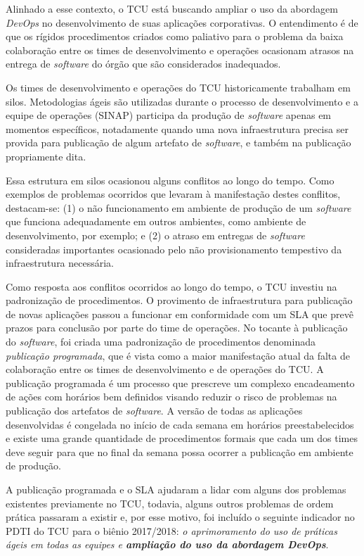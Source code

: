 Alinhado a esse contexto, o \acrfull{TCU} está buscando ampliar o uso da abordagem
\textit{DevOps} no desenvolvimento de suas aplicações corporativas. O
entendimento é de que os rígidos procedimentos criados como paliativo para o
problema da baixa colaboração entre os times de desenvolvimento e operações
ocasionam atrasos na entrega de \textit{software} do órgão que são considerados
inadequados.

Os times de desenvolvimento e operações do \acrshort{TCU} historicamente
trabalham em silos. Metodologias ágeis são utilizadas durante o processo de
desenvolvimento e a equipe de operações (\acrfull{SINAP}) participa da produção
de \textit{software} apenas em momentos específicos, notadamente quando uma nova
infraestrutura precisa ser provida para publicação de algum artefato de
\textit{software}, e também na publicação propriamente dita.

Essa estrutura em silos ocasionou alguns conflitos ao longo do tempo. Como
exemplos de problemas ocorridos que levaram à manifestação
destes conflitos, destacam-se: (1) o não funcionamento em ambiente de produção
de um \textit{software} que funciona adequadamente
em outros ambientes, como ambiente de desenvolvimento, por exemplo; e (2) o
atraso em entregas de \textit{software} consideradas importantes ocasionado
pelo não provisionamento tempestivo da infraestrutura necessária.

Como resposta aos conflitos ocorridos ao longo do tempo, o \acrshort{TCU}
investiu na padronização de procedimentos. O provimento de infraestrutura
para publicação de novas aplicações passou a funcionar em conformidade com um
\acrfull{SLA} que prevê prazos para conclusão por parte do time
de operações. No tocante à publicação do \textit{software}, foi criada uma padronização de
procedimentos denominada \emph{publicação programada}, que é vista como a maior
manifestação atual da falta de colaboração entre os times de desenvolvimento
e de operações do \acrshort{TCU}. A publicação programada
é um processo que prescreve um complexo encadeamento de ações com horários bem
definidos visando reduzir o risco de problemas na publicação dos artefatos de
{\it software}. A versão de todas as aplicações desenvolvidas é congelada no
início de cada semana em horários preestabelecidos e existe uma grande quantidade de
procedimentos formais que cada um dos times deve seguir para que no final da
semana possa ocorrer a publicação em ambiente de produção.

A publicação programada e o SLA ajudaram a lidar com alguns dos problemas
existentes previamente no \acrshort{TCU}, todavia, alguns outros problemas de ordem prática
passaram a existir e, por esse motivo, foi incluído o seguinte indicador no
\acrfull{PDTI} do \acrshort{TCU} para o biênio 2017/2018: \emph{o aprimoramento do
uso de práticas ágeis em todas as equipes e \textbf{ampliação do uso da
abordagem DevOps}}.

